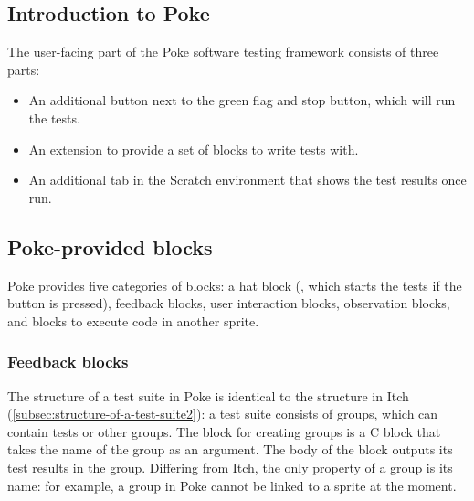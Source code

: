 \documentclass[../main]{subfiles}
\begin{document}
\subsection{Introduction to Poke}\label{subsec:introduction-to-poke}

The user-facing part of the Poke software testing framework consists of three parts:

\begin{itemize}
    \item An additional button next to the green flag and stop button, which will run the tests.
    \item An extension to provide a set of blocks to write tests with.
    \item An additional tab in the Scratch environment that shows the test results once run.
\end{itemize}


\subsection{Poke-provided blocks}\label{subsec:poke-provided-blocks}

Poke provides five categories of blocks: a hat block (, which starts the tests if the button is pressed), feedback blocks, user interaction blocks, observation blocks, and blocks to execute code in another sprite.

\subsubsection{Feedback blocks}

\begin{scratch}[scale=0.7]
\end{scratch}

The structure of a test suite in Poke is identical to the structure in Itch (\cref{subsec:structure-of-a-test-suite2}): a test suite consists of groups, which can contain tests or other groups.
The block for creating groups is a C block that takes the name of the group as an argument.
The body of the block outputs its test results in the group.
Differing from Itch, the only property of a group is its name: for example, a group in Poke cannot be linked to a sprite at the moment.
\end{document}
